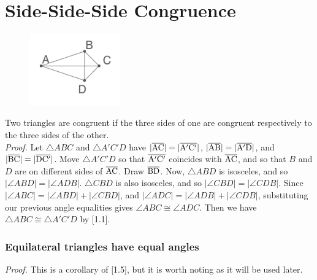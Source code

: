 \documentclass{report}
\begin{document}
\section{Side-Side-Side Congruence}
\begin{figure} %
    \centering
    \includegraphics[width=0.35\textwidth]{SSS}
\end{figure}
Two triangles are congruent if the three sides of one are congruent respectively to the three sides of the other.
\\[\baselineskip]
\textit{Proof.} Let $\triangle{ABC}$ and $\triangle{A'C'D}$ have $|\overline{\rm AC}|=|\overline{\rm A'C'}|$, $|\overline{\rm AB}|=|\overline{\rm A'D}|$, and $|\overline{\rm BC}|=|\overline{\rm DC'}|$. Move $\triangle{A'C'D}$ so that $\overline{\rm A'C'}$ coincides with $\overline{\rm AC}$, and so that $B$ and $D$ are on different sides of $\overline{\rm AC}$. Draw $\overline{\rm BD}$. Now, $\triangle{ABD}$ is isosceles, and so $|\angle ABD| = |\angle ADB|$. $\triangle{CBD}$ is also isosceles, and so $|\angle CBD| = |\angle CDB|$. Since $|\angle ABC| = |\angle ABD|+|\angle CBD|$, and $|\angle ADC| = |\angle ADB|+|\angle CDB|$, substituting our previous angle equalities gives $\angle ABC \cong \angle ADC$. Then we have $\triangle{ABC} \cong \triangle{A'C'D}$ by [1.1].

\subsubsection{Equilateral triangles have equal angles}
\textit{Proof.} This is a corollary of [1.5], but it is worth noting as it will be used later.
\end{document}
